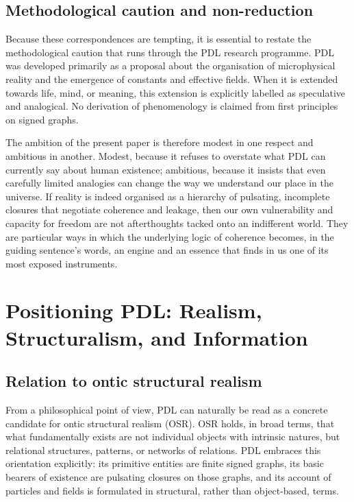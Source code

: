 \documentclass[11pt,a4paper]{article}
\theoremstyle{definition}
\begin{document}
\subsection{Methodological caution and non-reduction}

Because these correspondences are tempting, it is essential to restate the methodological caution that runs through the PDL research programme.\cite{Laubscher_PDL_Position_2024,Laubscher_Existence_PulsatingClosure_2026} PDL was developed primarily as a proposal about the organisation of microphysical reality and the emergence of constants and effective fields. When it is extended towards life, mind, or meaning, this extension is explicitly labelled as speculative and analogical. No derivation of phenomenology is claimed from first principles on signed graphs.

The ambition of the present paper is therefore modest in one respect and ambitious in another. Modest, because it refuses to overstate what PDL can currently say about human existence; ambitious, because it insists that even carefully limited analogies can change the way we understand our place in the universe. If reality is indeed organised as a hierarchy of pulsating, incomplete closures that negotiate coherence and leakage, then our own vulnerability and capacity for freedom are not afterthoughts tacked onto an indifferent world. They are particular ways in which the underlying logic of coherence becomes, in the guiding sentence’s words, an engine and an essence that finds in us one of its most exposed instruments.

\section{Positioning PDL: Realism, Structuralism, and Information}
\label{sec:positioning}

\subsection{Relation to ontic structural realism}

From a philosophical point of view, PDL can naturally be read as a concrete candidate for ontic structural realism (OSR). OSR holds, in broad terms, that what fundamentally exists are not individual objects with intrinsic natures, but relational structures, patterns, or networks of relations.\cite{Laubscher_Existence_PulsatingClosure_2026,Laubscher_PDL_Position_2024} PDL embraces this orientation explicitly: its primitive entities are finite signed graphs, its basic bearers of existence are pulsating closures on those graphs, and its account of particles and fields is formulated in structural, rather than object-based, terms.\cite{Laubscher_EmergencePhysicalReality_2024,Laubscher_MinimalClosures_46_2024}
\end{document}
